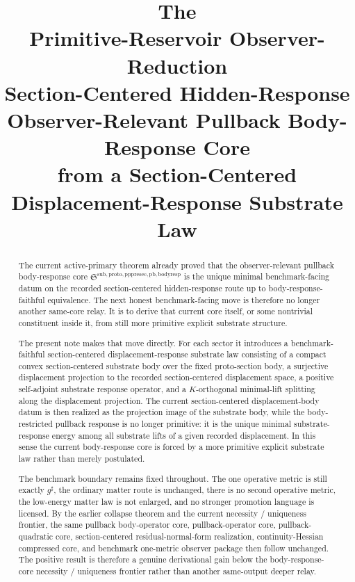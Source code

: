 \documentclass[11pt]{article}
\title{\textbf{The \TheoryName{}}\\[0.4em]
\large Primitive-Reservoir Observer-Reduction\\
\large Section-Centered Hidden-Response\\
\large Observer-Relevant Pullback Body-Response Core\\
\large from a Section-Centered Displacement-Response Substrate Law}
\author{}
\date{}
\newcommand{\CompletedMetric}{g^{\sharp}}
\newcommand{\PullbackBodyResponseCore}{\mathfrak S^{\mathrm{sub,proto,pppresec,pb,bodyresp}}}
\begin{document}
\maketitle

\begin{abstract}
The current active-primary theorem already proved that the observer-relevant pullback body-response core \(\PullbackBodyResponseCore\) is the unique minimal benchmark-facing datum on the recorded section-centered hidden-response route up to body-response-faithful equivalence. The next honest benchmark-facing move is therefore no longer another same-core relay. It is to derive that current core itself, or some nontrivial constituent inside it, from still more primitive explicit substrate structure.

The present note makes that move directly. For each sector it introduces a benchmark-faithful section-centered displacement-response substrate law consisting of a compact convex section-centered substrate body over the fixed proto-section body, a surjective displacement projection to the recorded section-centered displacement space, a positive self-adjoint substrate response operator, and a \(K\)-orthogonal minimal-lift splitting along the displacement projection. The current section-centered displacement-body datum is then realized as the projection image of the substrate body, while the body-restricted pullback response is no longer primitive: it is the unique minimal substrate-response energy among all substrate lifts of a given recorded displacement. In this sense the current body-response core is forced by a more primitive explicit substrate law rather than merely postulated.

The benchmark boundary remains fixed throughout. The one operative metric is still exactly \(\CompletedMetric\), the ordinary matter route is unchanged, there is no second operative metric, the low-energy matter law is not enlarged, and no stronger promotion language is licensed. By the earlier collapse theorem and the current necessity / uniqueness frontier, the same pullback body-operator core, pullback-operator core, pullback-quadratic core, section-centered residual-normal-form realization, continuity-Hessian compressed core, and benchmark one-metric observer package then follow unchanged. The positive result is therefore a genuine derivational gain below the body-response-core necessity / uniqueness frontier rather than another same-output deeper relay.
\end{abstract}
\end{document}

